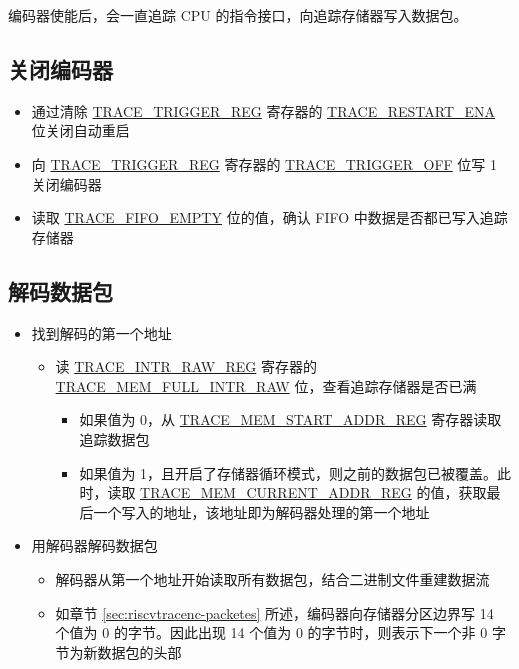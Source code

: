 \documentclass[main\_\_CN.tex]{subfiles}
\begin{document}
编码器使能后，会一直追踪 CPU 的指令接口，向追踪存储器写入数据包。

\subsection{关闭编码器}


\begin{itemize}
    \item 通过清除 \hyperref[regdesc:TRACETRIGGERREG]{TRACE\_TRIGGER\_REG} 寄存器的 \hyperref[fielddesc:TRACERESTARTENA]{TRACE\_RESTART\_ENA} 位关闭自动重启

    \item 向 \hyperref[regdesc:TRACETRIGGERREG]{TRACE\_TRIGGER\_REG} 寄存器的 \hyperref[fielddesc:TRACETRIGGEROFF]{TRACE\_TRIGGER\_OFF} 位写 1 关闭编码器

    \item 读取 \hyperref[fielddesc:TRACEFIFOEMPTY]{TRACE\_FIFO\_EMPTY} 位的值，确认 FIFO 中数据是否都已写入追踪存储器

\end{itemize}

\subsection{解码数据包}

\begin{itemize}
    \item 找到解码的第一个地址
        \begin{itemize}
            \item 读 \hyperref[regdesc:TRACEINTRRAWREG]{TRACE\_INTR\_RAW\_REG} 寄存器的 \hyperref[fielddesc:TRACEMEMFULLINTRRAW]{TRACE\_MEM\_FULL\_INTR\_RAW} 位，查看追踪存储器是否已满
            \begin{itemize}
                \item 如果值为 0，从 \hyperref[regdesc:TRACEMEMSTARTADDRREG]{TRACE\_MEM\_START\_ADDR\_REG} 寄存器读取追踪数据包
                \item 如果值为 1，且开启了存储器循环模式，则之前的数据包已被覆盖。此时，读取 \hyperref[regdesc:TRACEMEMCURRENTADDRREG]{TRACE\_MEM\_CURRENT\_ADDR\_REG} 的值，获取最后一个写入的地址，该地址即为解码器处理的第一个地址
            \end{itemize}
        \end{itemize}

    \item 用解码器解码数据包
        \begin{itemize}
            \item 解码器从第一个地址开始读取所有数据包，结合二进制文件重建数据流
            \item 如章节 \ref{sec:riscvtracenc-packetes} 所述，编码器向存储器分区边界写 14 个值为 0 的字节。因此出现 14 个值为 0 的字节时，则表示下一个非 0 字节为新数据包的头部
        \end{itemize}
\end{itemize}
\end{document}
